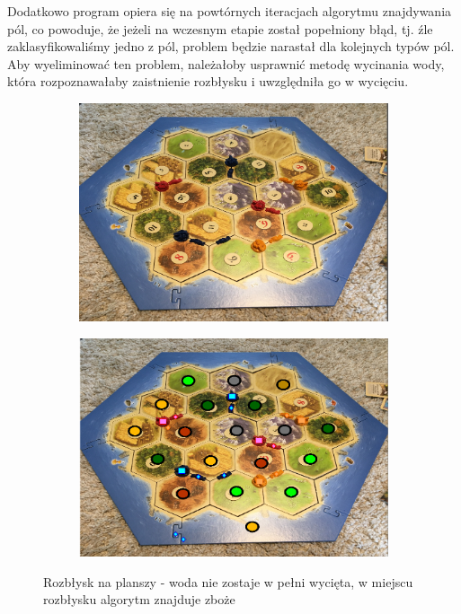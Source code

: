 \documentclass[a4paper]{article}
\begin{document}
	Dodatkowo program opiera się na powtórnych iteracjach algorytmu znajdywania pól, co powoduje, że jeżeli na wczesnym etapie został popełniony błąd, tj. źle zaklasyfikowaliśmy jedno z pól, problem będzie narastał dla kolejnych typów pól. Aby wyeliminować ten problem, należałoby usprawnić metodę wycinania wody, która rozpoznawałaby zaistnienie rozbłysku i uwzględniła go w wycięciu.
	
	 \begin{figure}[H]
        \begin{subfigure}[]{0.5\linewidth}
        \includegraphics[width=\linewidth]{pictures/fields/flash.png}
        \end{subfigure}
        \begin{subfigure}[]{0.5\linewidth}
        \includegraphics[width=\linewidth]{pictures/fields/after_flash.png}
        \end{subfigure}

        \caption{Rozbłysk na planszy - woda nie zostaje w pełni wycięta, w miejscu rozbłysku
        algorytm znajduje zboże}
        \label{fig:problem_light}
    \end{figure}
    
\end{document}
